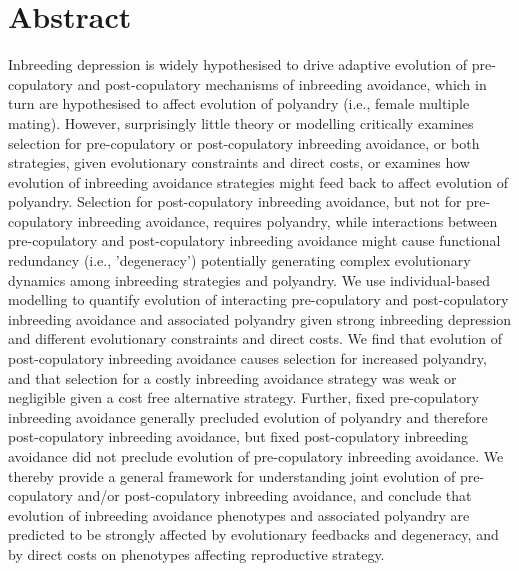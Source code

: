 \documentclass[10pt,letterpaper]{article}
\begin{document}
\section*{Abstract}
Inbreeding depression is widely hypothesised to drive adaptive evolution of pre-copulatory and post-copulatory mechanisms of inbreeding avoidance, which in turn are hypothesised to affect evolution of polyandry (i.e., female multiple mating). However, surprisingly little theory or modelling critically examines selection for pre-copulatory or post-copulatory inbreeding avoidance, or both strategies, given evolutionary constraints and direct costs, or examines how evolution of inbreeding avoidance strategies might feed back to affect evolution of polyandry. Selection for post-copulatory inbreeding avoidance, but not for pre-copulatory inbreeding avoidance, requires polyandry, while interactions between pre-copulatory and post-copulatory inbreeding avoidance might cause functional redundancy (i.e., 'degeneracy') potentially generating complex evolutionary dynamics among inbreeding strategies and polyandry. We use individual-based modelling to quantify evolution of interacting pre-copulatory and post-copulatory inbreeding avoidance and associated polyandry given strong inbreeding depression and different evolutionary constraints and direct costs. We find that evolution of post-copulatory inbreeding avoidance causes selection for increased polyandry, and that selection for a costly inbreeding avoidance strategy was weak or negligible given a cost free alternative strategy. Further, fixed pre-copulatory inbreeding avoidance generally precluded evolution of polyandry and therefore post-copulatory inbreeding avoidance, but fixed post-copulatory inbreeding avoidance did not preclude evolution of pre-copulatory inbreeding avoidance. We thereby provide a general framework for understanding joint evolution of pre-copulatory and/or post-copulatory inbreeding avoidance, and conclude that evolution of inbreeding avoidance phenotypes and associated polyandry are predicted to be strongly affected by evolutionary feedbacks and degeneracy, and by direct costs on phenotypes affecting reproductive strategy.
\end{document}
